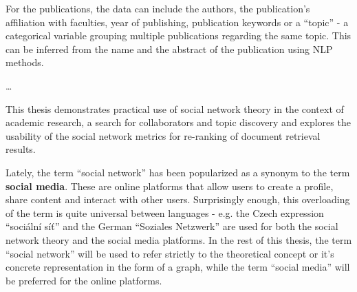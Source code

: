 For the publications, the data can include the authors, the publication's affiliation with faculties, year of publishing, publication keywords or a ``topic'' - a categorical variable grouping multiple publications regarding the same topic. This can be inferred from the name and the abstract of the publication using NLP methods.

\dots

This thesis demonstrates practical use of social network theory in the context of academic research, a search for collaborators and topic discovery and explores the usability of the social network metrics for re-ranking of document retrieval results.

Lately, the term ``social network'' has been popularized as a synonym to the term \textbf{social media}.
These are online platforms that allow users to create a profile, share content and interact with other users.
Surprisingly enough, this overloading of the term is quite universal between languages - e.g. the Czech expression ``sociální síť'' and the German ``Soziales Netzwerk'' are used for both the social network theory and the social media platforms.
In the rest of this thesis, the term ``social network'' will be used to refer strictly to the theoretical concept or it's concrete representation in the form of a graph, while the term ``social media'' will be preferred for the online platforms.
